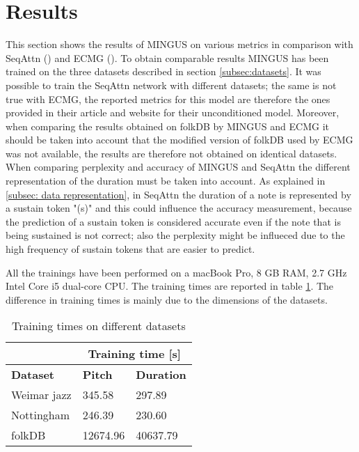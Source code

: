 \documentclass{article}
\begin{document}
\newpage

\section{Results} \label{sec:results}
This section shows the results of MINGUS on various metrics in comparison with SeqAttn (\cite{seqAttn}) and ECMG (\cite{ECMG}). To obtain comparable results MINGUS has been trained on the three datasets described in section \ref{subsec:datasets}. It was possible to train the SeqAttn network with different datasets; the same is not true with ECMG, the reported metrics for this model are therefore the ones provided in their article and website for their unconditioned model. Moreover, when comparing the results obtained on folkDB by MINGUS and ECMG it should be taken into account that the modified version of folkDB used by ECMG was not available, the results are therefore not obtained on identical datasets.
When comparing perplexity and accuracy of MINGUS and SeqAttn the different representation of the duration must be taken into account. As explained in \ref{subsec: data representation}, in SeqAttn the duration of a note is represented by a sustain token "(s)" and this could influence the accuracy measurement, because the prediction of a sustain token is considered accurate even if the note that is being sustained is not correct; also the perplexity might be influeced due to the high frequency of sustain tokens that are easier to predict.

All the trainings have been performed on a macBook Pro, 8 GB RAM, 2.7 GHz Intel Core i5 dual-core CPU. The training times are reported in table \ref{tab:times}. The difference in training times is mainly due to the dimensions of the datasets.

\begin{table}[htbp]
	\caption{Training times on different datasets}
	\begin{center}
		\begin{tabular}{ p{2cm} p{2cm} p{2cm} }
		    \hline
             & \multicolumn{2}{c}{Training time [s]} \\
            \hline
            \textbf{Dataset} &  
            \textbf{Pitch} &
            \textbf{Duration} \\
            \hline
            \hline
            Weimar jazz & 345.58 & 297.89 \\
            Nottingham & 246.39 & 230.60 \\
            folkDB & 12674.96 & 40637.79 \\
            \hline
    \end{tabular}
	\label{tab:times}
	\end{center}
\end{table}
\end{document}
